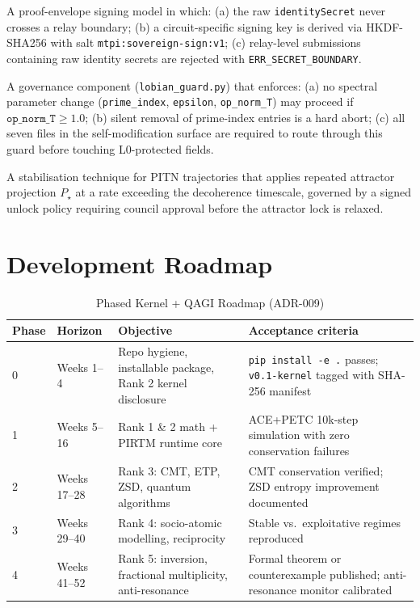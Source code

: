 \documentclass[12pt,a4paper]{article}
\theoremstyle{definition}
\theoremstyle{plain}
\theoremstyle{remark}
\begin{document}
\begin{claimbox}[title={Claim 8 --- BLS12-381 Sovereign Signing with HKDF Isolation}]
A proof-envelope signing model in which: (a) the raw \texttt{identitySecret}
never crosses a relay boundary; (b) a circuit-specific signing key is derived
via HKDF-SHA256 with salt \texttt{mtpi:sovereign-sign:v1}; (c) relay-level
submissions containing raw identity secrets are rejected with
\texttt{ERR\_SECRET\_BOUNDARY}.
\end{claimbox}

\begin{claimbox}[title={Claim 9 --- Lobian Guard with L0 Spectral Pre-Check}]
A governance component (\texttt{lobian\_guard.py}) that enforces: (a) no
spectral parameter change (\texttt{prime\_index}, \texttt{epsilon},
\texttt{op\_norm\_T}) may proceed if $\texttt{op\_norm\_T} \ge 1.0$;
(b) silent removal of prime-index entries is a hard abort; (c) all seven files
in the self-modification surface are required to route through this guard
before touching L0-protected fields.
\end{claimbox}

\begin{claimbox}[title={Claim 10 --- PEQZEA Attractor Locking}]
A stabilisation technique for PITN trajectories that applies repeated attractor
projection $P_\star$ at a rate exceeding the decoherence timescale, governed by
a signed unlock policy requiring council approval before the attractor lock is
relaxed.
\end{claimbox}

\newpage

\section{Development Roadmap}
\label{sec:roadmap}

\begin{table}[h!]
\centering
\caption{Phased Kernel + QAGI Roadmap (ADR-009)}
\begin{tabular}{p{1.3cm}p{1.9cm}p{4.2cm}p{4.6cm}}
\toprule
\textbf{Phase} & \textbf{Horizon} & \textbf{Objective} & \textbf{Acceptance criteria} \\
\midrule
0 & Weeks 1--4   & Repo hygiene, installable package, Rank 2 kernel disclosure & \texttt{pip install -e .} passes; \texttt{v0.1-kernel} tagged with SHA-256 manifest \\
1 & Weeks 5--16  & Rank 1 \& 2 math + PIRTM runtime core & ACE+PETC 10k-step simulation with zero conservation failures \\
2 & Weeks 17--28 & Rank 3: CMT, ETP, ZSD, quantum algorithms & CMT conservation verified; ZSD entropy improvement documented \\
3 & Weeks 29--40 & Rank 4: socio-atomic modelling, reciprocity & Stable vs.\ exploitative regimes reproduced \\
4 & Weeks 41--52 & Rank 5: inversion, fractional multiplicity, anti-resonance & Formal theorem or counterexample published; anti-resonance monitor calibrated \\
\bottomrule
\end{tabular}
\end{table}
\end{document}
